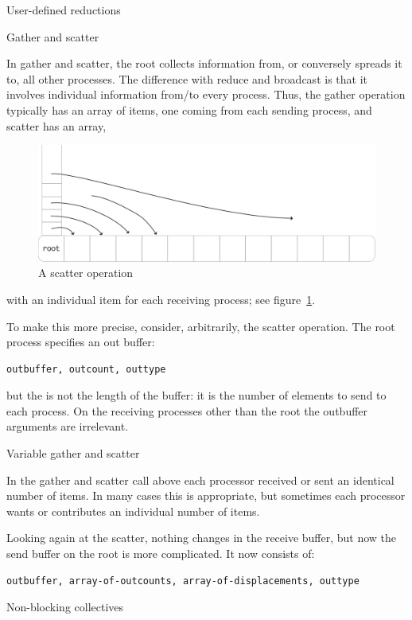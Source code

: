  {User-defined reductions}
\label{mpi:op-create}

 {Gather and scatter}

In gather and scatter, the root collects information from, or conversely spreads it to,
all other processes. The difference with reduce and broadcast is that it involves
individual information from/to every process. Thus, the gather operation typically 
has an array of items, one coming from each sending process, and scatter has an array,
\begin{figure}[ht]
  \includegraphics[scale=.12]{graphics/scatter-simple}
  \caption{A scatter operation}
  \label{fig:scatter}
\end{figure}
with an individual item for each receiving process; see figure~\ref{fig:scatter}.

To make this more precise, consider, arbitrarily,
the scatter operation. The root process specifies an out buffer:
\begin{verbatim}
outbuffer, outcount, outtype
\end{verbatim}
but the  is not the length of the buffer: it is the number
of elements to send to each process.
On the receiving processes other than the root the outbuffer arguments are irrelevant.

 {Variable gather and scatter}

In the gather and scatter call above each processor received or sent
an identical number of items. In many cases this is appropriate, but
sometimes each processor wants or contributes an individual number of
items.

Looking again at the scatter, nothing changes in the receive buffer,
but now the send buffer on the root is more complicated. It now consists of:
\begin{verbatim}
outbuffer, array-of-outcounts, array-of-displacements, outtype
\end{verbatim}

 {Non-blocking collectives}
\label{sec:mpi3collect}

